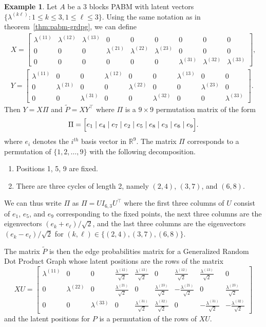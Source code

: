 \documentclass[
  11pt,
]{article}
\theoremstyle{definition}
\theoremstyle{definition}
\newtheorem{example}{Example}[section]
\theoremstyle{definition}
\theoremstyle{definition}
\theoremstyle{remark}
\begin{document}
\begin{example} Let $A$ be a $3$ blocks PABM with latent vectors $\{\lambda^{(k \ell)} \colon 1 \leq k \leq 3, 1 \leq \ell \leq 3\}$. 
Using the same notation as in theorem~\ref{thm:pabm-grdpg}, we can define
\begin{gather*}
X = \begin{bmatrix}
\lambda^{(11)} & \lambda^{(12)} & \lambda^{(13)} & 0 & 0 & 0 & 0 & 0 & 0 \\
0 & 0 & 0 & \lambda^{(21)} & \lambda^{(22)} & \lambda^{(23)} & 0 & 0 & 0 \\
0 & 0 & 0 & 0 & 0 & 0 & \lambda^{(31)} & \lambda^{(32)} & \lambda^{(33)}
\end{bmatrix}, \\
Y = \begin{bmatrix}
\lambda^{(11)} & 0 & 0 & \lambda^{(12)} & 0 & 0 & \lambda^{(13)} & 0 & 0 \\
0 & \lambda^{(21)} & 0 & 0 & \lambda^{(22)} & 0 & 0 & \lambda^{(23)} & 0 \\
0 & 0 & \lambda^{(31)} & 0 & 0 & \lambda^{(32)} & 0 & 0 & \lambda^{(33)}
\end{bmatrix}.
\end{gather*}
Then $Y = X \Pi$ and $\tilde{P} = X Y^{\top}$ where $\Pi$ is a $9 \times 9$ 
permutation matrix of the form
$$\Pi = 
\Bigl[e_1 \mid e_4 \mid e_7 \mid e_2 \mid e_5 \mid e_8 \mid e_3
\mid e_6 \mid e_9 \Bigr].$$
where $e_i$ denotes the $i^{th}$ basis vector in $\mathbb{R}^{9}$. 
The matrix $\Pi$ corresponds to a permutation of $\{1,2,\dots,9\}$ with the following decomposition.
\begin{enumerate}
\item Positions 1, 5, 9 are fixed.
\item There are three cycles of length 2, namely $(2, 4)$, $(3, 7)$, and $(6, 8)$.
\end{enumerate}
We can thus write $\Pi$ as $\Pi = U I_{6, 3} U^\top$ where the first three columns of $U$ consist of $e_1$, $e_5$, and $e_9$ corresponding to the fixed points, the next three columns are the eigenvectors $(e_k + e_{\ell}) / \sqrt{2}$, and the last three columns are the eigenvectors $(e_k - e_{\ell}) / \sqrt{2}$ for $(k, \ell) \in \{(2,4),(3,7),(6,8)\}$.

The matrix $\tilde{P}$ is then the edge probabilities matrix for a 
Generalized Random Dot Product Graph whose latent positions 
are the rows of the matrix
$$XU = \begin{bmatrix}
  \lambda^{(11)} & 0 & 0 &
  \frac{\lambda^{(12)}}{\sqrt{2}} & \frac{\lambda^{(13)}}{\sqrt{2}} & 0 &
  \frac{\lambda^{(12)}}{\sqrt{2}} & \frac{\lambda^{(13)}}{\sqrt{2}} & 0 \\
  0 & \lambda^{(22)} & 0 &
  \frac{\lambda^{(21)}}{\sqrt{2}} & 0 & \frac{\lambda^{(23)}}{\sqrt{2}} &
  -\frac{\lambda^{(21)}}{\sqrt{2}} & 0 & \frac{\lambda^{(23)}}{\sqrt{2}} \\
  0 & 0 & \lambda^{(33)} &
  0 & \frac{\lambda^{(31)}}{\sqrt{2}} & \frac{\lambda^{(32)}}{\sqrt{2}} &
  0 & -\frac{\lambda^{(31)}}{\sqrt{2}} & -\frac{\lambda^{(32)}}{\sqrt{2}}
\end{bmatrix}$$
and the latent positions for $P$ is a permutation of the rows of
$XU$. 
\end{example}
\end{document}
